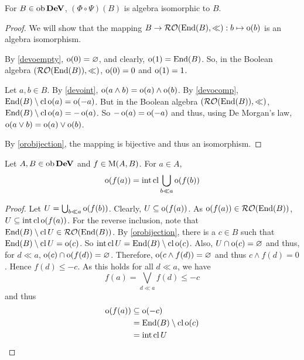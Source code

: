 \begin{theorem}
	\label{phipsiisom}
	For \( B \in \obj{\DeV} \), \( (\Phi \circ \Psi)(B) \) is algebra isomorphic to \( B \).
\end{theorem}
\begin{proof}
	We will show that the mapping \( B \to \RO(\End(B),\ll): b \mapsto \o(b) \) is an algebra isomorphism.

	By \ref{devoempty}, \( \o(0) = \emptyset \), and clearly, \( \o(1) = \End(B) \).  So, in the Boolean algebra \( (\RO(\End(B)),\sll) \), \( \o(0) = 0 \) and \( \o(1) = 1 \).
	
	Let \( a,b \in B \).  By \ref{devoint}, \( \o(a \wedge b) = \o(a) \wedge \o(b) \).  By \ref{devocomp}, \( \End(B) \setminus \cl{\o(a)} = \o(-a) \).  But in the Boolean algebra \( (\RO(\End(B)),\sll) \), \( \End(B) \setminus \cl{\o(a)} = -\o(a) \).  So \( -\o(a) = \o(-a) \) and thus, using De Morgan's law, \( \o(a \vee b) = \o(a) \vee \o(b) \).
	
	By \ref{orobijection}, the mapping is bijective and thus an isomorphism.
\end{proof}


\begin{lemma}
	\label{ofintclcup}
	Let \( A,B \in \obj{\DeV} \) and \( f \in \mor(A,B) \).  For \( a \in A \),
	\[ \o(f(a)) = \int\cl{\bigcup_{b \ll a} \o(f(b))} \]
\end{lemma}
\begin{proof}
	Let \( U = \bigcup_{b \ll a} \o(f(b)) \).  Clearly, \( U \subseteq \o(f(a)) \).  As \( \o(f(a)) \in \RO(\End(B)) \), \( U \subseteq \int\cl{\o(f(a))} \).  For the reverse inclusion, note that \( \End(B) \setminus \cl{U} \in \RO(\End(B)) \).  By \ref{orobijection}, there is a \( c \in B \) such that \( \End(B) \setminus \cl{U} = \o(c) \).    So \( \int\cl{U} = \End(B) \setminus \cl{\o(c)} \).  Also, \( U \cap \o(c) = \emptyset \) and thus, for \( d \ll a \), \( \o(c) \cap \o(f(d)) = \emptyset \).  Therefore, \( \o(c \wedge f(d)) = \emptyset \) and thus \( c \wedge f(d) = 0 \).  Hence \( f(d) \leq -c \).  As this holds for all \( d \ll a \), we have
	\[ f(a) = \bigvee_{d \ll a} f(d) \leq -c \]
	and thus
	\begin{align*}
		\o(f(a)) &\subseteq \o(-c) \\
		&= \End(B) \setminus \cl{\o(c)} \\
		&= \int\cl{U}
	\end{align*}
\end{proof}

